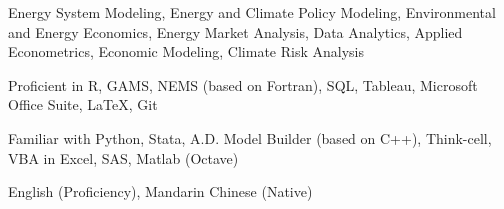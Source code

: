 


\begin{pubitems} %
    \item {Energy System Modeling, Energy and Climate Policy Modeling, Environmental and Energy Economics, Energy Market Analysis, Data Analytics, Applied Econometrics, Economic Modeling, Climate Risk Analysis}
\end{pubitems}



\begin{pubitems} %
    \item {Proficient in R, GAMS, NEMS (based on Fortran), SQL, Tableau, Microsoft Office Suite, \LaTeX, Git}
    \item {Familiar with Python, Stata, A.D. Model Builder (based on C++), Think-cell, VBA in Excel, SAS, Matlab (Octave)}
\end{pubitems}




\begin{pubitems} %
    \item {English (Proficiency), Mandarin Chinese (Native)}
\end{pubitems}


